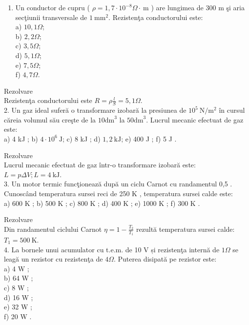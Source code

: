 
\begin{enumerate}
  \item Un conductor de cupru ( $\rho=1,7 \cdot 10^{-8} \Omega \cdot \mathrm{~m}$ ) are lungimea de 300 m şi aria secţiunii transversale de $1 \mathrm{~mm}^{2}$. Rezistenţa conductorului este:\\
a) $10,1 \Omega$;\\
b) $2,2 \Omega$;\\
c) $3,5 \Omega$;\\
d) $5,1 \Omega$;\\
e) $7,5 \Omega$;\\
f) $4,7 \Omega$.
\end{enumerate}

Rezolvare\\
Rezistenţa conductorului este $R=\rho \frac{l}{S}=5,1 \Omega$.\\
2. Un gaz ideal suferă o transformare izobară la presiunea de $10^{5} \mathrm{~N} / \mathrm{m}^{2}$ în cursul căreia volumul său creşte de la $10 \mathrm{dm}^{3}$ la $50 \mathrm{dm}^{3}$. Lucrul mecanic efectuat de gaz este:\\
a) 4 kJ ; b) $4 \cdot 10^{6} \mathrm{~J}$; c) 8 kJ ; d) $1,2 \mathrm{~kJ}$; e) 400 J ; f) 5 J .

Rezolvare\\
Lucrul mecanic efectuat de gaz într-o transformare izobară este: $L=p \Delta V ; L=4 \mathrm{~kJ}$.\\
3. Un motor termic funcţionează după un ciclu Carnot cu randamentul 0,5 . Cunoscând temperatura sursei reci de 250 K , temperatura sursei calde este:\\
a) 600 K ; b) 500 K ; c) 800 K ; d) 400 K ; e) 1000 K ; f) 300 K .

Rezolvare\\
Din randamentul ciclului Carnot $\eta=1-\frac{T_{2}}{T_{1}}$ rezultă temperatura sursei calde: $T_{1}=500 \mathrm{~K}$.\\
4. La bornele unui acumulator cu t.e.m. de 10 V și rezistenţa internă de $1 \Omega$ se leagă un rezistor cu rezistenţa de $4 \Omega$. Puterea disipată pe rezistor este:\\
a) 4 W ;\\
b) 64 W ;\\
c) 8 W ;\\
d) 16 W ;\\
e) 32 W ;\\
f) 20 W .

